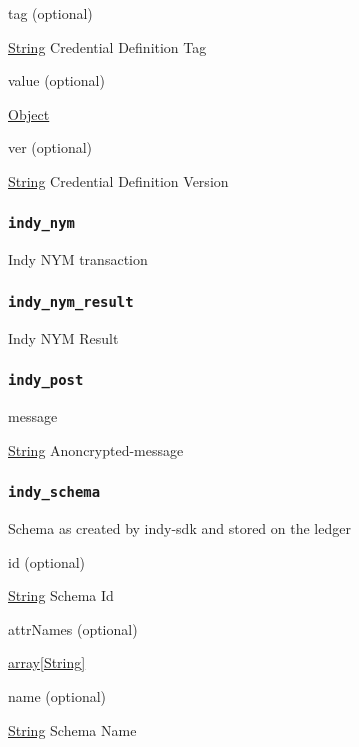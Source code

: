 tag (optional)

{\protect\hyperlink{string}{String}} Credential Definition Tag

value (optional)

{\protect\hyperlink{object}{Object}}

ver (optional)

{\protect\hyperlink{string}{String}} Credential Definition Version

\hypertarget{indy_nym}{%
\subsubsection{\texorpdfstring{\protect\hypertarget{indy_nym}{}{\texttt{indy\_nym}}}{indy\_nym}}\label{indy_nym}}

Indy NYM transaction

\hypertarget{indy_nym_result}{%
\subsubsection{\texorpdfstring{\protect\hypertarget{indy_nym_result}{}{\texttt{indy\_nym\_result}}}{indy\_nym\_result}}\label{indy_nym_result}}

Indy NYM Result

\hypertarget{indy_post}{%
\subsubsection{\texorpdfstring{\protect\hypertarget{indy_post}{}{\texttt{indy\_post}}}{indy\_post}}\label{indy_post}}

message

{\protect\hyperlink{string}{String}} Anoncrypted-message

\hypertarget{indy_schema}{%
\subsubsection{\texorpdfstring{\protect\hypertarget{indy_schema}{}{\texttt{indy\_schema}}}{indy\_schema}}\label{indy_schema}}

Schema as created by indy-sdk and stored on the ledger

id (optional)

{\protect\hyperlink{string}{String}} Schema Id

attrNames (optional)

{\protect\hyperlink{string}{array{[}String{]}}}

name (optional)

{\protect\hyperlink{string}{String}} Schema Name

